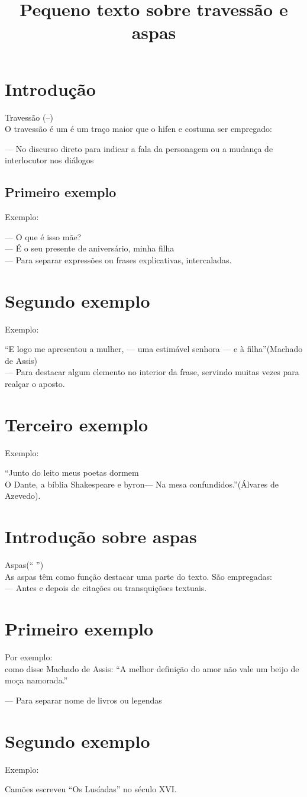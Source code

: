 \documentclass[12pt, article, oneside]{memoir}
\begin{document}
\title{ Pequeno texto sobre travessão e aspas}
\maketitle

\tableofcontents
\newpage
\chapter{Introdução}  


Travessão (--)\\
O travessão é um é um traço maior que o hifen e costuma ser empregado:

--- No discurso direto para indicar a fala da personagem ou a mudança de interlocutor nos diálogos
\section{Primeiro exemplo}

Exemplo:

--- O que é isso mãe?\\
--- É o seu presente de aniversário, minha filha\\
--- Para separar expressões ou frases explicativas, intercaladas.\\
\chapter{Segundo exemplo}
Exemplo:

``E logo me apresentou a mulher, --- uma estimável senhora --- e à filha''(Machado de Assis)\\
--- Para destacar algum elemento no interior da frase, servindo muitas vezes para realçar o aposto.\\
\newpage
\chapter{Terceiro exemplo}
Exemplo:

``Junto do leito meus poetas dormem\\
O Dante, a bíblia Shakespeare e byron--- \newline
Na mesa confundidos.''(Álvares de Azevedo).
\newpage
\chapter{Introdução sobre aspas}
Aspas(`` '')\\
As aspas têm como função destacar uma parte do texto. São empregadas:\\
--- Antes e depois de citações ou transquiçõses textuais.
\newpage
\chapter{Primeiro exemplo}
Por exemplo:\\
como disse Machado de Assis: ``A melhor definição do amor não vale um beijo de moça namorada.''

--- Para separar nome de livros ou legendas\\
\newpage
\chapter{Segundo exemplo}
Exemplo:

Camões escreveu ``Os Lusíadas'' no século XVI.
\end{document}
